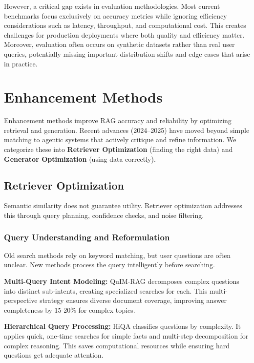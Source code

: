 \documentclass[11pt]{article}
\begin{document}
However, a critical gap exists in evaluation methodologies. Most current benchmarks focus exclusively on accuracy metrics while ignoring efficiency considerations such as latency, throughput, and computational cost. This creates challenges for production deployments where both quality and efficiency matter. Moreover, evaluation often occurs on synthetic datasets rather than real user queries, potentially missing important distribution shifts and edge cases that arise in practice.

\section{Enhancement Methods}

Enhancement methods improve RAG accuracy and reliability by optimizing retrieval and generation. Recent advances (2024–2025) have moved beyond simple matching to agentic systems that actively critique and refine information. We categorize these into \textbf{Retriever Optimization} (finding the right data) and \textbf{Generator Optimization} (using data correctly).

\subsection{Retriever Optimization}

Semantic similarity does not guarantee utility. Retriever optimization addresses this through query planning, confidence checks, and noise filtering.

\subsubsection{Query Understanding and Reformulation}

Old search methods rely on keyword matching, but user questions are often unclear. New methods process the query intelligently before searching.

\textbf{Multi-Query Intent Modeling:} QuIM-RAG \citep{saha2025quim} decomposes complex questions into distinct sub-intents, creating specialized searches for each. This multi-perspective strategy ensures diverse document coverage, improving answer completeness by 15-20\% for complex topics.

\textbf{Hierarchical Query Processing:} HiQA \citep{chen2024hiqa} classifies questions by complexity. It applies quick, one-time searches for simple facts and multi-step decomposition for complex reasoning. This saves computational resources while ensuring hard questions get adequate attention.
\end{document}

